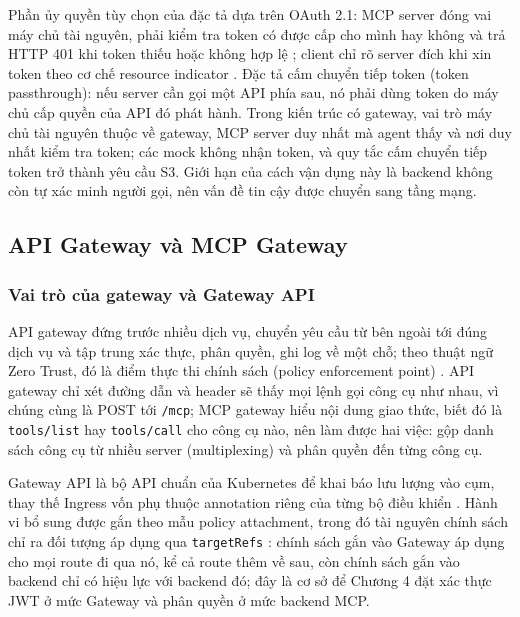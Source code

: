 Phần ủy quyền tùy chọn của đặc tả dựa trên OAuth 2.1: MCP server đóng vai máy chủ tài nguyên, phải kiểm tra token có được cấp cho mình hay không và trả HTTP 401 khi token thiếu hoặc không hợp lệ \parencite{mcp_authorization}; client chỉ rõ server đích khi xin token theo cơ chế resource indicator \parencite{rfc8707}. Đặc tả cấm chuyển tiếp token (token passthrough): nếu server cần gọi một API phía sau, nó phải dùng token do máy chủ cấp quyền của API đó phát hành. Trong kiến trúc có gateway, vai trò máy chủ tài nguyên thuộc về gateway, MCP server duy nhất mà agent thấy và nơi duy nhất kiểm tra token; các mock không nhận token, và quy tắc cấm chuyển tiếp token trở thành yêu cầu S3. Giới hạn của cách vận dụng này là backend không còn tự xác minh người gọi, nên vấn đề tin cậy được chuyển sang tầng mạng.

\subsection{API Gateway và MCP Gateway}

\subsubsection{Vai trò của gateway và Gateway API}

API gateway đứng trước nhiều dịch vụ, chuyển yêu cầu từ bên ngoài tới đúng dịch vụ và tập trung xác thực, phân quyền, ghi log về một chỗ; theo thuật ngữ Zero Trust, đó là điểm thực thi chính sách (policy enforcement point) \parencite{nist80207}. API gateway chỉ xét đường dẫn và header sẽ thấy mọi lệnh gọi công cụ như nhau, vì chúng cùng là POST tới \texttt{/mcp}; MCP gateway hiểu nội dung giao thức, biết đó là \texttt{tools/list} hay \texttt{tools/call} cho công cụ nào, nên làm được hai việc: gộp danh sách công cụ từ nhiều server (multiplexing) và phân quyền đến từng công cụ.

Gateway API là bộ API chuẩn của Kubernetes để khai báo lưu lượng vào cụm, thay thế Ingress vốn phụ thuộc annotation riêng của từng bộ điều khiển \parencite{gatewayapi,k8s_ingress}. Hành vi bổ sung được gắn theo mẫu policy attachment, trong đó tài nguyên chính sách chỉ ra đối tượng áp dụng qua \texttt{targetRefs} \parencite{gep713}: chính sách gắn vào Gateway áp dụng cho mọi route đi qua nó, kể cả route thêm về sau, còn chính sách gắn vào backend chỉ có hiệu lực với backend đó; đây là cơ sở để Chương 4 đặt xác thực JWT ở mức Gateway và phân quyền ở mức backend MCP.


